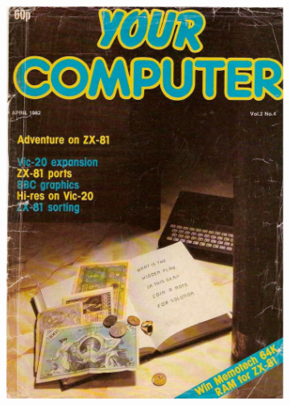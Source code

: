 \begin{frame}{}
\begin{figure}
\begin{subfigure}{.5\textwidth}
          \includegraphics[width=\linewidth]{images/YourComputer_1982_04}
        \end{subfigure}
    \end{figure}
\end{frame}
